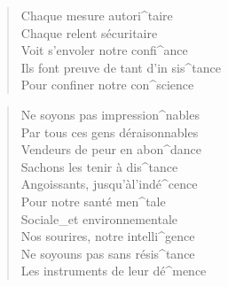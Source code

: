 \documentclass{leadsheet}
\begin{document}
\begin{song}
\begin{multicols}{2}
\begin{verse}
    Chaque mesure autori^taire \\
    Chaque relent sécuritaire \\
    Voit s'envoler notre confi^ance \\
    Ils font preuve de tant d'in sis^tance \\
    Pour confiner notre con^science \\
  \end{verse}
  \begin{chorus}[after-label=]\end{chorus}
  \begin{verse}
    Ne soyons pas impression^nables \\
    Par tous ces gens déraisonnables \\
    Vendeurs de peur en abon^dance \\
    Sachons les tenir à dis^tance \\

    Angoissants, jusqu'àl'indé^cence \\
    Pour notre santé men^tale \\
    Sociale\_et environnementale \\ 
    Nos sourires, notre intelli^gence \\
    Ne soyouns pas sans résis^tance \\
    Les instruments de leur dé^mence \\
  \end{verse}
  \begin{chorus}[after-label=]\end{chorus}
  \end{multicols}
\end{song}
\end{document}
